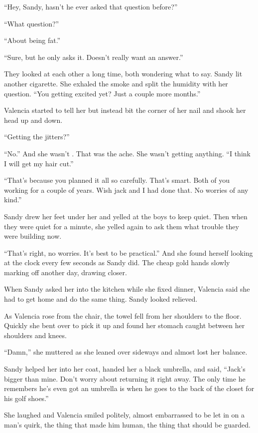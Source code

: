 \documentclass[twoside,10pt]{book}
\begin{document}
``Hey, Sandy, hasn't he ever asked that question before?''

``What question?''

``About being fat.''

``Sure, but he only asks it. Doesn't really want an answer.''

They looked at each other a long time, both wondering what to say. Sandy
lit another cigarette. She exhaled the smoke and split the humidity with
her question. ``You getting excited yet? Just a couple more months.''

Valencia started to tell her but instead bit the corner of her nail and
shook her head up and down.

``Getting the jitters?''

``No.'' And she wasn't . That was the ache. She wasn't getting anything.
``I think I will get my hair cut.''

``That's because you planned it all so carefully. That's smart. Both of
you working for a couple of years. Wish jack and I had done that. No
worries of any kind.''

Sandy drew her feet under her and yelled at the boys to keep quiet. Then
when they were quiet for a minute, she yelled again to ask them what
trouble they were building now.

``That's right, no worries. It's best to be practical.'' And she found
herself looking at the clock every few seconds as Sandy did. The cheap
gold hands slowly marking off another day, drawing closer.

When Sandy asked her into the kitchen while she fixed dinner, Valencia
said she had to get home and do the same thing. Sandy looked relieved.

As Valencia rose from the chair, the towel fell from her shoulders to
the floor. Quickly she bent over to pick it up and found her stomach
caught between her shoulders and knees.

``Damn,'' she muttered as she leaned over sideways and almost lost her
balance.

Sandy helped her into her coat, handed her a black umbrella, and said,
``Jack's bigger than mine. Don't worry about returning it right away.
The only time he remembers he's even got an umbrella is when he goes to
the back of the closet for his golf shoes.''

She laughed and Valencia smiled politely, almost embarrassed to be let
in on a man's quirk, the thing that made him human, the thing that
should be guarded.
\end{document}
